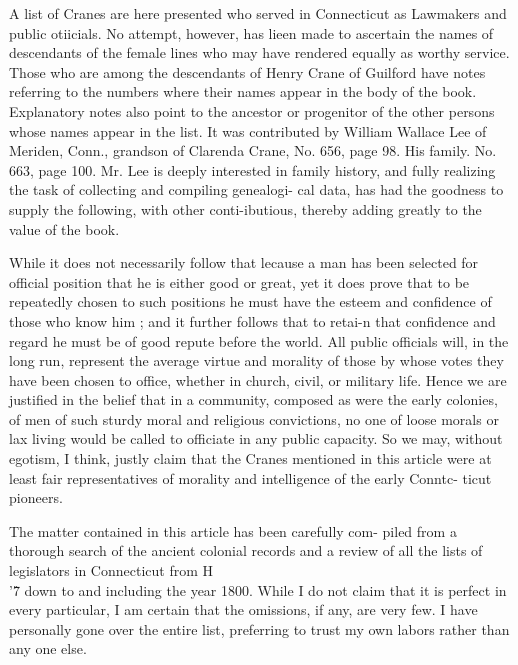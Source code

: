 A list of Cranes are here presented who served in Connecticut 
as Lawmakers and public otiicials. No attempt, however, has 
lieen made to ascertain the names of descendants of the female 
lines who may have rendered equally as worthy service. Those 
who are among the descendants of Henry Crane of Guilford have 
notes referring to the numbers where their names appear in the 
body of the book. Explanatory notes also point to the ancestor 
or progenitor of the other persons whose names appear in the list. 
It was contributed by William Wallace Lee of Meriden, Conn., 
grandson of Clarenda Crane, No. 656, page 98. His family. No. 
663, page 100. Mr. Lee is deeply interested in family history, 
and fully realizing the task of collecting and compiling genealogi- 
cal data, has had the goodness to supply the following, with other 
conti-ibutious, thereby adding greatly to the value of the book. 



While it does not necessarily follow that lecause a man has 
been selected for official position that he is either good or great, 
yet it does prove that to be repeatedly chosen to such positions 
he must have the esteem and confidence of those who know him ; 
and it further follows that to retai-n that confidence and regard 
he must be of good repute before the world. All public officials 
will, in the long run, represent the average virtue and morality 
of those by whose votes they have been chosen to office, whether 
in church, civil, or military life. Hence we are justified in the 
belief that in a community, composed as were the early colonies, 
of men of such sturdy moral and religious convictions, no one of 
loose morals or lax living would be called to officiate in any 
public capacity. So we may, without egotism, I think, justly 
claim that the Cranes mentioned in this article were at least fair 
representatives of morality and intelligence of the early Conntc- 
ticut pioneers. 

The matter contained in this article has been carefully com- 
piled from a thorough search of the ancient colonial records and 
a review of all the lists of legislators in Connecticut from H\\'\^7 
down to and including the year 1800. While I do not claim that 
it is perfect in every particular, I am certain that the omissions, 
if any, are very few. I have personally gone over the entire list, 
preferring to trust my own labors rather than any one else. 




